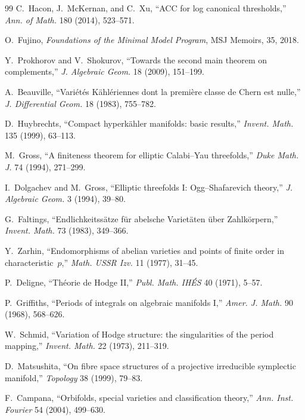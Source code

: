 \documentclass[11pt,openany]{book}
\begin{document}
\begin{thebibliography}{99}
C.~Hacon, J.~McKernan, and C.~Xu,
``ACC for log canonical thresholds,''
\textit{Ann. of Math.} 180 (2014), 523--571.

O.~Fujino,
\textit{Foundations of the Minimal Model Program},
MSJ Memoirs, 35, 2018.

Y.~Prokhorov and V.~Shokurov,
``Towards the second main theorem on complements,''
\textit{J. Algebraic Geom.} 18 (2009), 151--199.

A.~Beauville,
``Vari\'{e}t\'{e}s K\"{a}hl\'{e}riennes dont la premi\`{e}re classe de Chern est nulle,''
\textit{J. Differential Geom.} 18 (1983), 755--782.

D.~Huybrechts,
``Compact hyperk\"{a}hler manifolds: basic results,''
\textit{Invent. Math.} 135 (1999), 63--113.

M.~Gross,
``A finiteness theorem for elliptic Calabi--Yau threefolds,''
\textit{Duke Math. J.} 74 (1994), 271--299.

I.~Dolgachev and M.~Gross,
``Elliptic threefolds I: Ogg--Shafarevich theory,''
\textit{J. Algebraic Geom.} 3 (1994), 39--80.

G.~Faltings,
``Endlichkeitss\"{a}tze f\"{u}r abelsche Variet\"{a}ten \"{u}ber Zahlk\"{o}rpern,''
\textit{Invent. Math.} 73 (1983), 349--366.

Y.~Zarhin,
``Endomorphisms of abelian varieties and points of finite order in characteristic~$p$,''
\textit{Math. USSR Izv.} 11 (1977), 31--45.

P.~Deligne,
``Th\'{e}orie de Hodge II,''
\textit{Publ. Math. IH\'ES} 40 (1971), 5--57.

P.~Griffiths,
``Periods of integrals on algebraic manifolds I,''
\textit{Amer. J. Math.} 90 (1968), 568--626.

W.~Schmid,
``Variation of Hodge structure: the singularities of the period mapping,''
\textit{Invent. Math.} 22 (1973), 211--319.

D.~Matsushita,
``On fibre space structures of a projective irreducible symplectic manifold,''
\textit{Topology} 38 (1999), 79--83.

F.~Campana,
``Orbifolds, special varieties and classification theory,''
\textit{Ann. Inst. Fourier} 54 (2004), 499--630.

\end{thebibliography}
\end{document}
